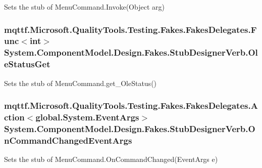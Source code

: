 Sets the stub of Menu\-Command.\-Invoke(\-Object arg)

\hypertarget{class_system_1_1_component_model_1_1_design_1_1_fakes_1_1_stub_designer_verb_a98802455259eb5bb2a1ce7b7ab156b9e}{
\subsubsection[{Ole\-Status\-Get}]{\setlength{\rightskip}{0pt plus 5cm}mqttf.\-Microsoft.\-Quality\-Tools.\-Testing.\-Fakes.\-Fakes\-Delegates.\-Func$<$int$>$ System.\-Component\-Model.\-Design.\-Fakes.\-Stub\-Designer\-Verb.\-Ole\-Status\-Get}}\label{class_system_1_1_component_model_1_1_design_1_1_fakes_1_1_stub_designer_verb_a98802455259eb5bb2a1ce7b7ab156b9e}


Sets the stub of Menu\-Command.\-get\-\_\-\-Ole\-Status()

\hypertarget{class_system_1_1_component_model_1_1_design_1_1_fakes_1_1_stub_designer_verb_a5fd75378924f9408acd78501d01c6a68}{
\subsubsection[{On\-Command\-Changed\-Event\-Args}]{\setlength{\rightskip}{0pt plus 5cm}mqttf.\-Microsoft.\-Quality\-Tools.\-Testing.\-Fakes.\-Fakes\-Delegates.\-Action$<$global.\-System.\-Event\-Args$>$ System.\-Component\-Model.\-Design.\-Fakes.\-Stub\-Designer\-Verb.\-On\-Command\-Changed\-Event\-Args}}\label{class_system_1_1_component_model_1_1_design_1_1_fakes_1_1_stub_designer_verb_a5fd75378924f9408acd78501d01c6a68}


Sets the stub of Menu\-Command.\-On\-Command\-Changed(\-Event\-Args e)

